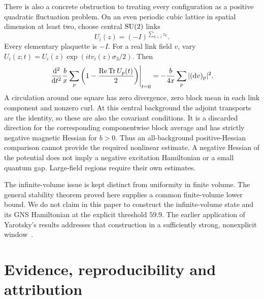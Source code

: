 There is also a concrete obstruction to treating every configuration
as a positive quadratic fluctuation problem. On an even periodic
cubic lattice in spatial dimension at least two, choose central
$\operatorname{SU}(2)$ links
\[
 U_i(z)=(-I)^{\sum_{k<i}z_k}.
\]
Every elementary plaquette is $-I$. For a real link field $v$, vary
$U_i(z;t)=U_i(z)\exp(itv_i(z)\sigma_3/2)$. Then
\begin{equation}\label{eq:negative-hessian}
 \left.\frac{\mathrm d^2}{\mathrm dt^2}
 \frac{b}{x}\sum_p\left(1-\frac{\operatorname{Re}\operatorname{Tr} U_p(t)}2\right)
 \right|_{t=0}
 =-\frac{b}{4x}\sum_p|(\mathrm dv)_p|^2 .
\end{equation}
A circulation around one square has zero divergence, zero block mean
in each link component and nonzero curl. At this central background the
adjoint transports are the identity, so these are also the covariant
conditions. It is a discarded direction for the corresponding
componentwise block average and has strictly negative magnetic
Hessian for $b>0$. Thus an all-background positive-Hessian comparison
cannot provide the required nonlinear estimate. A negative Hessian of
the potential does not imply a negative excitation Hamiltonian or a
small quantum gap. Large-field regions require their own estimates.

The infinite-volume issue is kept distinct from uniformity in finite
volume. The general stability theorem proved here supplies a common
finite-volume lower bound. We do not claim in this paper to construct
the infinite-volume state and its GNS Hamiltonian at the explicit
threshold $59.9$. The earlier application of Yarotsky's results
addresses that construction in a sufficiently strong, nonexplicit
window~\cite{Yarotsky,Spectral}.

\section{Evidence, reproducibility and attribution}\label{sec:evidence}

